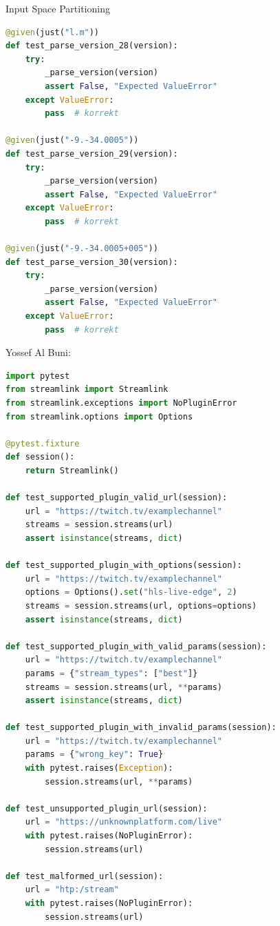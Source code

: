 \documentclass[a4paper]{scrreprt}
\newcounter{question}
\begin{document}
\begin{question}{Input Space Partitioning}
\begin{enumerate}[topsep=0pt, leftmargin=*]
\begin{answer}
\begin{lstlisting}[language=Python]
@given(just("l.m"))
def test_parse_version_28(version):
    try:
        _parse_version(version)
        assert False, "Expected ValueError"
    except ValueError:
        pass  # korrekt

@given(just("-9.-34.0005"))
def test_parse_version_29(version):
    try:
        _parse_version(version)
        assert False, "Expected ValueError"
    except ValueError:
        pass  # korrekt

@given(just("-9.-34.0005+005"))
def test_parse_version_30(version):
    try:
        _parse_version(version)
        assert False, "Expected ValueError"
    except ValueError:
        pass  # korrekt
\end{lstlisting}
 Yossef Al Buni: \\
            \begin{lstlisting}[language=Python, caption={Hypothesis strategies for generating test input combinations}]
    import pytest
from streamlink import Streamlink
from streamlink.exceptions import NoPluginError
from streamlink.options import Options

@pytest.fixture
def session():
    return Streamlink()

def test_supported_plugin_valid_url(session):
    url = "https://twitch.tv/examplechannel"
    streams = session.streams(url)
    assert isinstance(streams, dict)

def test_supported_plugin_with_options(session):
    url = "https://twitch.tv/examplechannel"
    options = Options().set("hls-live-edge", 2)
    streams = session.streams(url, options=options)
    assert isinstance(streams, dict)

def test_supported_plugin_with_valid_params(session):
    url = "https://twitch.tv/examplechannel"
    params = {"stream_types": ["best"]}
    streams = session.streams(url, **params)
    assert isinstance(streams, dict)

def test_supported_plugin_with_invalid_params(session):
    url = "https://twitch.tv/examplechannel"
    params = {"wrong_key": True}
    with pytest.raises(Exception):
        session.streams(url, **params)

def test_unsupported_plugin_url(session):
    url = "https://unknownplatform.com/live"
    with pytest.raises(NoPluginError):
        session.streams(url)

def test_malformed_url(session):
    url = "htp:/stream"
    with pytest.raises(NoPluginError):
        session.streams(url)


\end{lstlisting}
\end{answer}
\end{enumerate}
\end{question}
\end{document}
